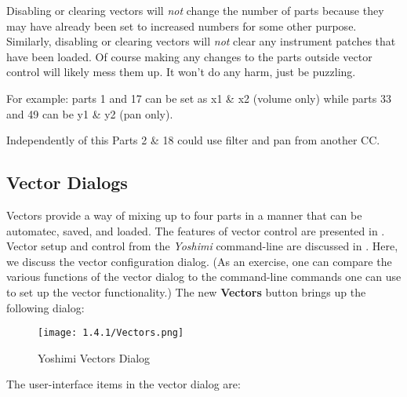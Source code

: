    Disabling or clearing vectors will \textsl{not} change the number of parts
   because they may have already been set to increased numbers for some other
   purpose.  Similarly, disabling or clearing vectors will \textsl{not} clear
   any instrument patches that have been loaded.
   Of course making any changes to the parts outside vector control will likely
   mess them up. It won't do any harm, just be puzzling.

   For example:
   parts 1 and 17 can be set as x1 \& x2 (volume only) while parts 33 and 49
   can be y1 \& y2 (pan only).

   Independently of this Parts 2 \& 18 could use filter and pan from another
   CC.

\subsection{Vector Dialogs}
\label{subsec:vector_dialogs}

   Vectors provide a way of mixing up to four parts in a manner that can be
   automatec, saved, and loaded.  The features of vector control are presented
   in .
   Vector setup and control from the \textsl{Yoshimi} command-line are
   discussed in
   .
   Here, we discuss the vector configuration dialog.
   (As an exercise, one can compare the various functions of the vector dialog
   to the command-line commands one can use to set up the vector
   functionality.)
   The new \textbf{Vectors} button brings up the following dialog:

\begin{figure}[H]
   \centering
   \texttt{[image: 1.4.1/Vectors.png]}
   \caption{Yoshimi Vectors Dialog}
   \label{fig:yoshimi_vectors_dialog}
\end{figure}

   The user-interface items in the vector dialog are:

